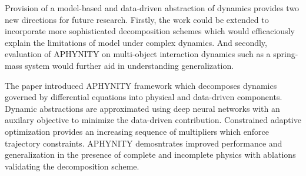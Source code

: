 \documentclass[11pt,letterpaper]{article}
\begin{document}
Provision of a model-based and data-driven abstraction of dynamics provides two new directions for future research. Firstly, the work could be extended to incorporate more sophisticated decomposition schemes which would efficaciously explain the limitations of model under complex dynamics. And secondly, evaluation of APHYNITY on multi-object interaction dynamics such as a spring-mass system would further aid in understanding generalization.

The paper introduced APHYNITY framework which decomposes dynamics governed by differential equations into physical and data-driven components. Dynamic abstractions are approximated using deep neural networks with an auxilary objective to minimize the data-driven contribution. Constrained adaptive optimization provides an increasing sequence of multipliers which enforce trajectory constraints. APHYNITY demosntrates improved performance and generalization in the presence of complete and incomplete physics with ablations validating the decomposition scheme. 
\end{document}

